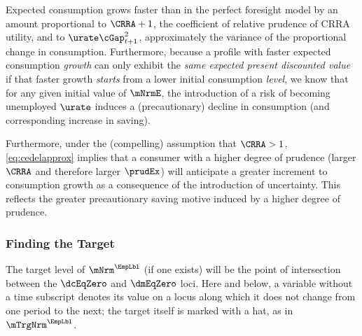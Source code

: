\documentclass{econark}
\begin{document}
Expected consumption grows faster than in the perfect foresight model by an amount proportional to $\CRRA+1$, the coefficient of relative prudence of CRRA utility, and to $\urate\cGap_{t+1}^{2}$, approximately the variance of the proportional change in consumption.  Furthermore, because a profile with faster expected consumption {\it growth} can only exhibit the {\it same expected present discounted value} if that faster growth {\it starts} from a lower initial consumption {\it level}, we know that for any given initial value of $\mNrmE$, the introduction of a risk of becoming unemployed $\urate$ induces a (precautionary) decline in consumption (and corresponding increase in saving).

Furthermore, under the (compelling) assumption that $\CRRA > 1$, \eqref{eq:cedelapprox} implies that a consumer with
a higher degree of prudence (larger $\CRRA$ and therefore larger $\prudEx$) will
anticipate a greater increment to consumption growth as a consequence of the introduction of uncertainty.  This reflects the greater precautionary
saving motive induced by a higher degree of prudence.



\subsubsection{Finding the Target}

The target level of $\mNrm^{\EmpLbl}$ (if one exists) will be the point of intersection between the $\dcEqZero$ and $\dmEqZero$ loci.  Here and below, a variable without a time subscript denotes its value on a locus along which it does not change from one period to the next; the target itself is marked with a hat, as in $\mTrgNrm^{\EmpLbl}$.  
\end{document}
